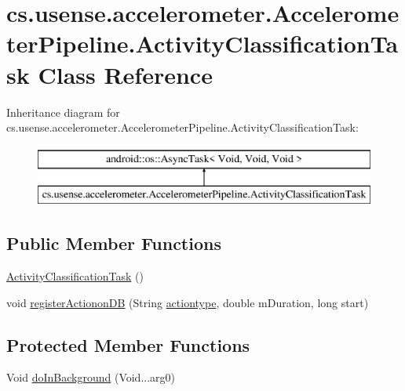 \hypertarget{classcs_1_1usense_1_1accelerometer_1_1_accelerometer_pipeline_1_1_activity_classification_task}{}\section{cs.\+usense.\+accelerometer.\+Accelerometer\+Pipeline.\+Activity\+Classification\+Task Class Reference}
\label{classcs_1_1usense_1_1accelerometer_1_1_accelerometer_pipeline_1_1_activity_classification_task}
Inheritance diagram for cs.\+usense.\+accelerometer.\+Accelerometer\+Pipeline.\+Activity\+Classification\+Task\+:\begin{figure}[H]
\begin{center}
\leavevmode
\includegraphics[height=2.000000cm]{classcs_1_1usense_1_1accelerometer_1_1_accelerometer_pipeline_1_1_activity_classification_task}
\end{center}
\end{figure}
\subsection*{Public Member Functions}
\begin{DoxyCompactItemize}
\item 
\hyperlink{classcs_1_1usense_1_1accelerometer_1_1_accelerometer_pipeline_1_1_activity_classification_task_a68c787c2575b05db6f8c0d53c0ba1312}{Activity\+Classification\+Task} ()
\item 
void \hyperlink{classcs_1_1usense_1_1accelerometer_1_1_accelerometer_pipeline_1_1_activity_classification_task_a099e6d2e3fe862f178fbb94d82416633}{register\+Actionon\+D\+B} (String \hyperlink{classcs_1_1usense_1_1accelerometer_1_1_accelerometer_pipeline_a0e1f7822542dab0066358cb0b06906ba}{actiontype}, double m\+Duration, long start)
\end{DoxyCompactItemize}
\subsection*{Protected Member Functions}
\begin{DoxyCompactItemize}
\item 
Void \hyperlink{classcs_1_1usense_1_1accelerometer_1_1_accelerometer_pipeline_1_1_activity_classification_task_a8b89be178b16d0447e059a6b1270294d}{do\+In\+Background} (Void...\+arg0)
\end{DoxyCompactItemize}

